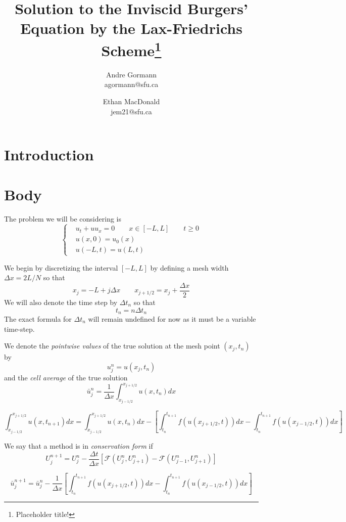 \documentclass{myproject}
\title{\vspace*{-1cm}Solution to the Inviscid Burgers' Equation by the Lax-Friedrichs Scheme\footnote{Placeholder title!}}
\date{}
\author{
    Andre Gormann\\
    agormann@sfu.ca
    \and
    Ethan MacDonald\\
    jem21@sfu.ca
}
\begin{document}
\maketitle
\vspace*{-1cm}


\section{Introduction}

\section{Body}

The problem we will be considering is
\begin{equation}
    \begin{cases}
        & u_t + uu_x = 0 \qquad x \in [-L, L] \qquad t \geq 0 \\
        & u(x,0) = u_0(x) \\
        & u(-L,t) = u(L,t)
    \end{cases}
\end{equation}

We begin by discretizing the interval $[-L,L]$ by defining a mesh width $\Delta x = 2L/N$ so that 
\[
    x_j = -L + j\Delta x \qquad x_{j+1/2} = x_j + \frac{\Delta x}{2}
\]
We will also denote the time step by $\Delta t_n$ so that
\[
    t_n = n\Delta t_n
\]
The exact formula for $\Delta t_n$ will remain undefined for now as it must be a variable time-step.

We denote the \emph{pointwise values} of the true solution at the mesh point $(x_j, t_n)$ by 
\[
    u_j^n = u(x_j,t_n)
\]
and the \emph{cell average} of the true solution 
\[
    \bar{u}_j^n = \frac{1}{\Delta x} \int_{x_{j-1/2}}^{x_{j+1/2}} u(x,t_n) dx
\]

\[
    \int_{x_{j-1/2}}^{x_{j+1/2}} u(x,t_{n+1}) dx = \int_{x_{j-1/2}}^{x_{j+1/2}} u(x,t_{n}) dx - \left[ \int_{t_n}^{t_{n+1}} f(u(x_{j+1/2},t)) dx - \int_{t_n}^{t_{n+1}} f(u(x_{j-1/2},t)) dx \right]
\]

We say that a method is in \emph{conservation form} if 
\[
    U_j^{n+1} = U_j^n - \frac{\Delta t}{\Delta x} \left[ \mathcal{F}(U_{j}^{n}, U_{j+1}^{n}) - \mathcal{F}(U_{j-1}^{n}, U_{j+1}^{n}) \right]
\]

\[
    \bar{u}_j^{n+1} = \bar{u}_j^n - \frac{1}{\Delta x}\left[ \int_{t_n}^{t_{n+1}} f(u(x_{j+1/2},t)) dx - \int_{t_n}^{t_{n+1}} f(u(x_{j-1/2},t)) dx \right]
\]
\end{document}
